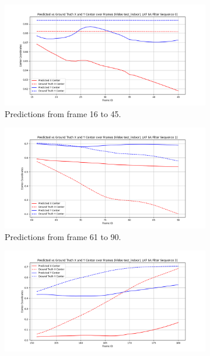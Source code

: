 \documentclass[12pt,oneside]{book} %
\begin{document}
\begin{figure}[H]
    \centering
    \begin{subfigure}[t]{0.45\textwidth}
        \includegraphics[width=\textwidth]{figures/framework/test_indoor1 LKF SA Filter - 0.png}
        \caption{Predictions from frame 16 to 45.}
        \label{fig:framework-test_indoor1-savgol-0}
    \end{subfigure}
    \hfill
    \begin{subfigure}[t]{0.45\textwidth}
        \includegraphics[width=\textwidth]{figures/framework/test_indoor1 LKF SA Filter - 1.png}
        \caption{Predictions from frame 61 to 90.}
        \label{fig:framework-test_indoor1-savgol-1}
    \end{subfigure}
    \vfill
    \begin{subfigure}[t]{0.45\textwidth}
        \includegraphics[width=\textwidth]{figures/framework/test_indoor1 LKF SA Filter - 3.png}

\end{subfigure}
\end{figure}
\end{document}
